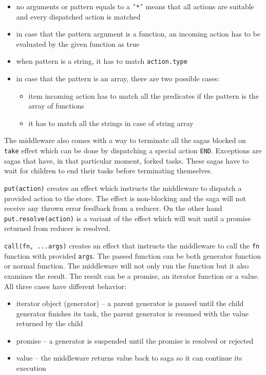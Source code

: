\begin{itemize}
\item no arguments or pattern equals to a \texttt{'*'} means that all actions are suitable and every dispatched action is matched
\item in case that the pattern argument is a function, an incoming action has to be evaluated by the given function as true
\item when pattern is a string, it has to match \texttt{action.type}
\item in case that the pattern is an array, there are two possible cases:

\begin{itemize}
\item item incoming action has to match all the 			predicates if the pattern is the array of functions
\item it has to match all the strings in case of string array
\end{itemize}  
\end{itemize}  

The middleware also comes with a way to terminate all the sagas blocked on \texttt{take} effect which can be done by dispatching a special action \texttt{END}. Exceptions are sagas that have, in that particular moment, forked tasks. These sagas have to wait for children to end their tasks before terminating themselves.

\texttt{put(action)} creates an effect which instructs the middleware to dispatch a provided action to the store. The effect is non-blocking and the saga will not receive any thrown error feedback from a reducer. On the other hand \texttt{put.resolve(action)} is a variant of the effect which will wait until a promise returned from reducer is resolved.

\texttt{call(fn, ...args)} creates an effect that instructs the middleware to call the \texttt{fn} function with provided \texttt{args}. The passed function can be both generator function or normal function. The middleware will not only run the function but it also examines the result. The result can be a promise, an iterator function or a value. All three cases have different behavior:
\begin{itemize}
\item iterator object (generator) -- a parent generator is paused until the child generator finishes its task, the parent generator is resumed with the value returned by the child
\item promise -- a generator is  suspended until the promise is resolved or rejected
\item value -- the middleware returns value back to saga so it can continue its execution
\end{itemize}  

